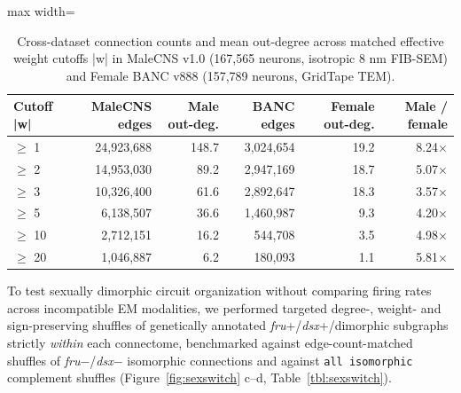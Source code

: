 \documentclass[11pt,a4paper]{article}
\begin{document}
\begin{table}[t]
\centering\small
\caption{Cross-dataset connection counts and mean out-degree across matched effective weight cutoffs |w| in MaleCNS v1.0 (167,565 neurons, isotropic 8 nm FIB-SEM) and Female BANC v888 (157,789 neurons, GridTape TEM).}\label{tbl:threshold}
\begin{adjustbox}{max width=\textwidth}
\begin{tabular}{lrrrrr}
\toprule
Cutoff |w| & MaleCNS edges & Male out-deg. & BANC edges & Female out-deg. & Male / female \\
\midrule
$\geq$ 1 & 24,923,688 & 148.7 & 3,024,654 & 19.2 & 8.24$\times$ \\
$\geq$ 2 & 14,953,030 & 89.2 & 2,947,169 & 18.7 & 5.07$\times$ \\
$\geq$ 3 & 10,326,400 & 61.6 & 2,892,647 & 18.3 & 3.57$\times$ \\
$\geq$ 5 & 6,138,507 & 36.6 & 1,460,987 & 9.3 & 4.20$\times$ \\
$\geq$ 10 & 2,712,151 & 16.2 & 544,708 & 3.5 & 4.98$\times$ \\
$\geq$ 20 & 1,046,887 & 6.2 & 180,093 & 1.1 & 5.81$\times$ \\
\bottomrule
\end{tabular}
\end{adjustbox}
\end{table}
To test sexually dimorphic circuit organization without comparing firing rates across incompatible EM modalities, we performed targeted degree-, weight- and sign-preserving shuffles of genetically annotated \emph{fru}+/\emph{dsx}+/dimorphic subgraphs strictly \emph{within} each connectome, benchmarked against edge-count-matched shuffles of \emph{fru}$-$/\emph{dsx}$-$ isomorphic connections and against \texttt{all isomorphic} complement shuffles (Figure~\ref{fig:sexswitch} c--d, Table~\ref{tbl:sexswitch}).
\end{document}
